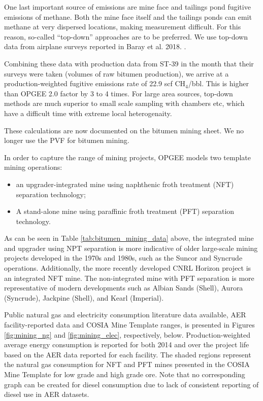 \documentclass[11pt]{report}
\begin{document}
One last important source of emissions are mine face and tailings pond fugitive emissions of methane. Both the mine face itself and the tailings ponds can emit methane at very dispersed locations, making measurement difficult. For this reason, so-called ``top-down'' approaches are to be preferred. We use top-down data from airplane surveys reported in Baray et al. 2018. \cite{Baray2018}.

Combining these data with production data from ST-39 in the month that their surveys were taken (volumes of raw bitumen production), we arrive at a production-weighted fugitive emissions rate of 22.9 scf CH$_4$/bbl. This is higher than OPGEE 2.0 factor by 3 to 4 times. For large area sources, top-down methods are much superior to small scale sampling with chambers etc, which have a difficult time with extreme local heterogenaity.

These calculations are now documented on the bitumen mining sheet. We no longer use the PVF for bitumen mining.

In order to capture the range of mining projects, OPGEE models two template mining operations: 
\begin{itemize}
\item an upgrader-integrated mine using naphthenic froth treatment (NFT) separation technology;
\item A stand-alone mine using paraffinic froth treatment (PFT) separation technology.
\end{itemize}

As can be seen in Table \ref{tab:bitumen_mining_data} above, the integrated mine and upgrader using NPT separation is more indicative of older large-scale mining projects developed in the 1970s and 1980s, such as the Suncor and Syncrude operations.  Additionally, the more recently developed CNRL Horizon project is an integrated NFT mine.  The non-integrated mine with PFT separation is more representative of modern developments such as Albian Sands (Shell), Aurora (Syncrude), Jackpine (Shell), and Kearl (Imperial). 

Public natural gas and electricity consumption literature data available, AER facility-reported data and COSIA Mine Template ranges, is presented in Figures \ref{fig:mining_ng} and \ref{fig:mining_elec}, respectively, below. Production-weighted average energy consumption is reported for both 2014 and over the project life based on the AER data reported for each facility. The shaded regions represent the natural gas consumption for NFT and PFT mines presented in the COSIA Mine Template for low grade and high grade ore. Note that no corresponding graph can be created for diesel consumption due to lack of consistent reporting of diesel use in AER datasets.
\end{document}
